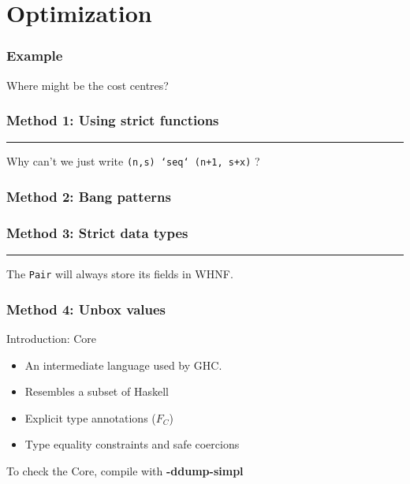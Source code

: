 \documentclass{beamer}
\newcommand{\inlinehaskell}[1]{\texttt{#1}}
\newcommand{\inlineshell}[1]{\textcolor{shellcolor}{\textbf{#1}}}
\begin{document}
\section{Optimization}

\begin{frame}
\frametitle{Example}
Where might be the cost centres?
\newline
{}
\end{frame}


\begin{frame}
\frametitle{Method 1: Using strict functions}
\par\noindent\rule{0.85\textwidth}{1.0pt}
\newline\newline
Why can't we just write \inlinehaskell{(n,s) `seq` (n+1, s+x)} ?
\end{frame}


\begin{frame}
\frametitle{Method 2: Bang patterns}
\end{frame}


\begin{frame}
\frametitle{Method 3: Strict data types}
\par\noindent\rule{0.85\textwidth}{1.0pt}
\newline\newline
The \inlinehaskell{Pair} will always store its fields in WHNF.
\end{frame}


\begin{frame}
\frametitle{Method 4: Unbox values}
Introduction: Core
\begin{itemize}
    \item An intermediate language used by GHC.
    \item Resembles a subset of Haskell
    \item Explicit type annotations ($F_C$)
    \item Type equality constraints and safe coercions
\end{itemize}
\bigskip
To check the Core, compile with \inlineshell{-ddump-simpl}
\end{frame}
\end{document}
